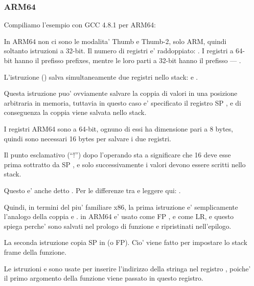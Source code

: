 \subsubsection{ARM64}


Compiliamo l'esempio con GCC 4.8.1 per ARM64:



In ARM64 non ci sono le modalita' Thumb e Thumb-2, solo ARM, quindi soltanto istruzioni a 32-bit.
Il numero di registri e' raddoppiato: .
I registri a 64-bit hanno il prefisso  prefixes, mentre le loro parti a 32-bit hanno il prefisso --- .

L'istruzione  () 
salva simultaneamente due registri nello stack:  e .

Questa istruzione puo' ovviamente salvare la coppia di valori in una posizione arbitraria in memoria, tuttavia in questo caso e'
specificato il registro \ac{SP} , e di conseguenza la coppia viene salvata nello stack.

I registri ARM64 sono a 64-bit, ognuno di essi ha dimensione pari a 8 bytes, quindi sono necessari 16 bytes per salvare i due registri.

Il punto esclamativo (``!'') dopo l'operando sta a significare che 16 deve esse prima sottratto da \ac{SP} , e solo successivamente
i valori devono essere scritti nello stack.

Questo e' anche detto .
Per le differenze tra  e  
leggere qui: .

Quindi, in termini del piu' familiare x86, la prima istruzione e' semplicamente l'analogo della coppia
 e .
 in ARM64 e' usato come \ac{FP} , e  
come \ac{LR}, e questo spiega perche' sono salvati nel prologo di funzione e ripristinati nell'epilogo.

La seconda istruzione copia \ac{SP} in  (o \ac{FP}).
Cio' viene fatto per impostare lo stack frame della funzione.

\label{pointers_ADRP_and_ADD}
Le istruzioni  e \ADD sono usate per inserire
l'indirizzo della stringa  nel registro  , 
poiche' il primo argomento della funzione viene passato in questo registro.

